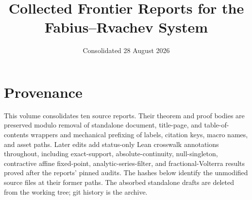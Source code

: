 \documentclass[11pt]{article}
\title{\bfseries Collected Frontier Reports for the Fabius--Rvachev System}
\author{}
\date{Consolidated 28 August 2026}
\numberwithin{equation}{section}
\theoremstyle{definition}
\theoremstyle{remark}
\begin{document}
\maketitle
\tableofcontents
\clearpage
\section*{Provenance}
This volume consolidates ten source reports.  Their theorem and proof bodies are preserved
modulo removal of standalone document, title-page, and table-of-contents wrappers and
mechanical prefixing of labels, citation keys, macro names, and asset paths.  Later edits add
status-only Lean crosswalk annotations throughout, including exact-support,
absolute-continuity, null-singleton, contractive affine fixed-point, analytic-series-filter,
and fractional-Volterra results proved after the reports' pinned audits.
The hashes below identify the unmodified source files at their former paths.  The absorbed
standalone drafts are deleted from the working tree; git history is the archive.
\end{document}
